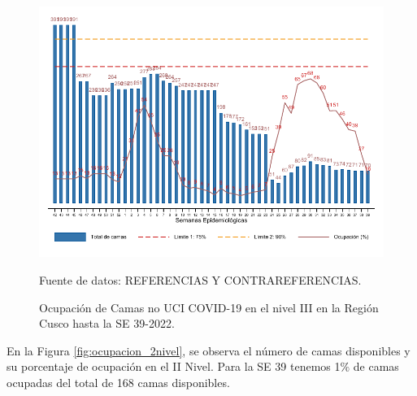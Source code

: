 \documentclass[12pt,a4paper,openany]{book}
\begin{document}
	\begin{figure}[htpb]
		\caption{Ocupación de Camas no UCI COVID-19 en el nivel III en la Región Cusco hasta la SE 39-2022.}\label{fig:ocupacion_3_nivel}
		\begin{center}
			\includegraphics[width=0.95\linewidth]{../figuras/nivel_3.pdf}
		\end{center}
		{\footnotesize {Fuente de datos: REFERENCIAS Y CONTRAREFERENCIAS.}}
	\end{figure}
	
	\clearpage
	
	En la Figura \ref{fig:ocupacion_2nivel}, se observa el número de camas disponibles y su porcentaje de ocupación en el II Nivel. Para la SE 39 tenemos 1$\%$ de camas ocupadas del total de 168 camas disponibles.
	
\end{document}
